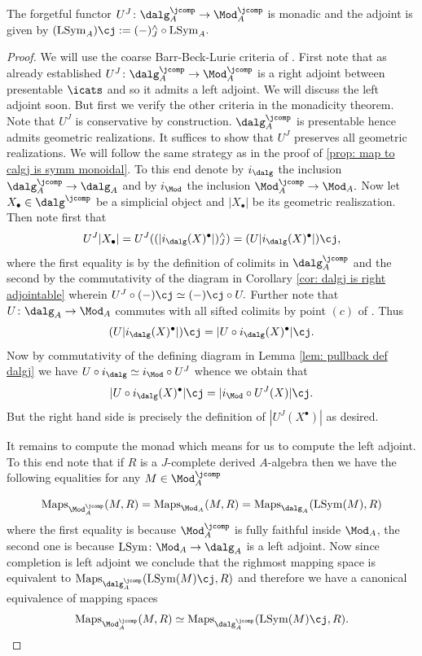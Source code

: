 \documentclass[10pt,reqno]{amsart}
\numberwithin{equation}{section}
\newcommand{\Maps}{\mathrm{Maps}}
\newcommand{\Sym}{\mathrm{Sym}}
\renewcommand{\L}{\mathrm{L}}
\begin{document}
\begin{proposition}\label{prop: dalgj is monadic.}
    The forgetful functor $U^J\colon \dalg_A^\jcomp\to \Mod_A^\jcomp$ is monadic and the adjoint is given by $(\L\Sym_A)\cj:=(-)^\wedge_J\circ \L\Sym_A.$
\end{proposition}
\begin{proof}
    We will use the coarse Barr-Beck-Lurie criteria of \cite[Theorem 4.7.0.3]{HA}. First note that as already established $U^J\colon \dalg_A^\jcomp\to \Mod_A^\jcomp$ is a right adjoint between presentable $\icats$ and so it admits a left adjoint. We will discuss the left adjoint soon. But first we verify the other criteria in the monadicity theorem. Note that $U^J$ is conservative by construction. $\dalg_A^\jcomp$ is presentable hence admits geometric realizations. It suffices to show that $U^J$ preserves all geometric realizations. We will follow the same strategy as in the proof of \ref{prop: map to calgj is symm monoidal}.
    To this end denote by $i_\dalg$ the inclusion $\dalg_A^\jcomp\to \dalg_A$ and by $i_\Mod$ the inclusion $\Mod_A^\jcomp\to \Mod_A.$
Now let $X_\bullet\in \dalg^\jcomp$ be a simplicial object and $|X_\bullet|$ be its geometric realiszation. Then note first that $$U^J|X_\bullet|=U^J((|i_\dalg(X)^\bullet|)^\wedge_J)=(U|i_\dalg(X)^\bullet|)\cj,$$ where the first equality is by the definition of colimits in $\dalg_A^\jcomp$ and the second by the commutativity of the diagram in Corollary \ref{cor: dalgj is right adjointable} wherein $U^J\circ (-)\cj\simeq (-)\cj\circ U.$
Further note that $U\colon \dalg_A\to \Mod_A$ commutes with all sifted colimits by point $(c)$ of \cite[Notation 4.2.28]{Rak20}. Thus $$(U|i_\dalg(X)^\bullet|)\cj=|U\circ i_{\dalg}(X)^\bullet|\cj.$$
Now by commutativity of the defining diagram in Lemma \ref{lem: pullback def dalgj} we have $U\circ i_\dalg \simeq i_\Mod\circ U^J$ whence we obtain that $$|U\circ i_{\dalg}(X)^\bullet|\cj=|i_\Mod \circ U^J(X)|\cj.$$
But the right hand side is precisely the definition of $|U^J(X^\bullet)|$ as desired.

It remains to compute the monad which means for us to compute the left adjoint. To this end note that if $R$ is a $J$-complete derived $A$-algebra then we have the following equalities for any $M\in \Mod_A^\jcomp$

$$\Maps_{\Mod_A^\jcomp}(M,R)=\Maps_{\Mod_A}(M,R)=\Maps_{\dalg_A}(\L\Sym(M),R)$$ where the first equality is because $\Mod_A^\jcomp$ is fully faithful inside $\Mod_A$, the second one is because $\L\Sym\colon \Mod_A\to \dalg_A$ is a left adjoint. Now since completion is left adjoint we conclude that the righmost mapping space is equivalent to $\Maps_{\dalg_A^\jcomp}(\L\Sym(M)\cj,R)$ and therefore we have a canonical equivalence of mapping spaces
    $$\Maps_{\Mod_A^\jcomp}(M,R)\simeq\Maps_{\dalg_A^\jcomp}(\L\Sym(M)\cj,R).$$
\end{proof}
\end{document}
